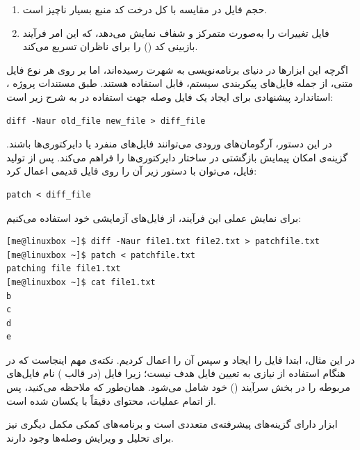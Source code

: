 \begin{enumerate}
  \item حجم فایل  در مقایسه با کل درخت کد منبع بسیار ناچیز است.
  \item فایل  تغییرات را به‌صورت متمرکز و شفاف نمایش می‌دهد، که این امر فرآیند بازبینی کد () را برای ناظران تسریع می‌کند.
\end{enumerate}

اگرچه این ابزارها در دنیای برنامه‌نویسی به شهرت رسیده‌اند، اما بر روی هر نوع فایل متنی، از جمله فایل‌های پیکربندی سیستم، قابل استفاده هستند. طبق مستندات پروژه ، استاندارد پیشنهادی برای ایجاد یک فایل وصله جهت استفاده در  به شرح زیر است:

\begin{latin}
\begin{lstlisting}
diff -Naur old_file new_file > diff_file
\end{lstlisting}
\end{latin}

در این دستور، آرگومان‌های ورودی می‌توانند فایل‌های منفرد یا دایرکتوری‌ها باشند. گزینه‌ی  امکان پیمایش بازگشتی در ساختار دایرکتوری‌ها را فراهم می‌کند. پس از تولید فایل، می‌توان با دستور زیر آن را روی فایل قدیمی اعمال کرد:

\begin{latin}
\begin{lstlisting}
patch < diff_file
\end{lstlisting}
\end{latin}

برای نمایش عملی این فرآیند، از فایل‌های آزمایشی خود استفاده می‌کنیم:

\begin{latin}
\begin{lstlisting}
[me@linuxbox ~]$ diff -Naur file1.txt file2.txt > patchfile.txt
[me@linuxbox ~]$ patch < patchfile.txt
patching file file1.txt
[me@linuxbox ~]$ cat file1.txt
b
c
d
e
\end{lstlisting}
\end{latin}

در این مثال، ابتدا فایل  را ایجاد و سپس آن را اعمال کردیم. نکته‌ی مهم اینجاست که در هنگام استفاده از  نیازی به تعیین فایل هدف نیست؛ زیرا فایل  (در قالب ) نام فایل‌های مربوطه را در بخش سرآیند () خود شامل می‌شود. همان‌طور که ملاحظه می‌کنید، پس از اتمام عملیات، محتوای  دقیقاً با  یکسان شده است.

ابزار  دارای گزینه‌های پیشرفته‌ی متعددی است و برنامه‌های کمکی مکمل دیگری نیز برای تحلیل و ویرایش وصله‌ها وجود دارند.

